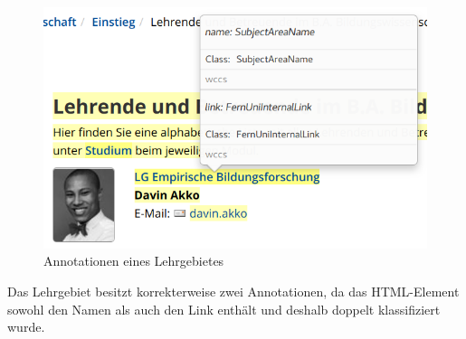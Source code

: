     \begin{figure}[htb]
        \centering
        \includegraphics[scale=\screenshotScaleFactor]{../resources/findings/case-study-1/babw/annotations/double-lg-annotation.png}
        \caption{Annotationen eines Lehrgebietes}
        \label{image:findingTeachersSubjectAreaAnnotations}
    \end{figure}

    Das Lehrgebiet besitzt korrekterweise zwei Annotationen,
    da das HTML-Element sowohl den Namen als auch den Link enthält
    und deshalb doppelt klassifiziert wurde.